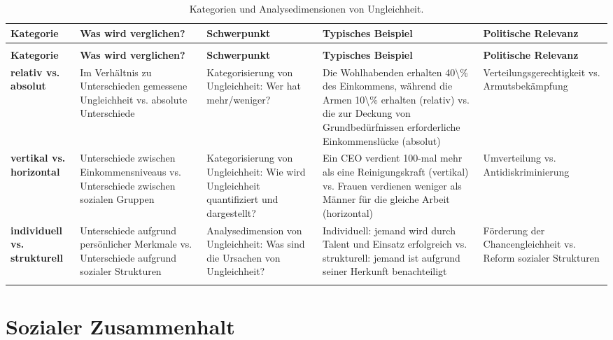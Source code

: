 \documentclass[
  nswissgerman,
  a4paper,
  openany]{book}
\begin{document}
\begin{longtable}[t]{>{\raggedright\arraybackslash}p{1.6cm}>{\raggedright\arraybackslash}p{3.0cm}>{\raggedright\arraybackslash}p{3.0cm}>{\raggedright\arraybackslash}p{3.0cm}l}

\caption{\label{tbl-inequality-categories}Kategorien und
Analysedimensionen von Ungleichheit.}

\tabularnewline

\toprule
\textbf{Kategorie} & \textbf{Was wird verglichen?} & \textbf{Schwerpunkt} & \textbf{Typisches Beispiel} & \textbf{Politische Relevanz}\\
\midrule
\endfirsthead
\multicolumn{5}{@{}l}{\textit{(continued)}}\\
\toprule
\textbf{Kategorie} & \textbf{Was wird verglichen?} & \textbf{Schwerpunkt} & \textbf{Typisches Beispiel} & \textbf{Politische Relevanz}\\
\midrule
\endhead

\endfoot
\bottomrule
\endlastfoot
\textbf{relativ vs. absolut} & Im Verhältnis zu Unterschieden gemessene Ungleichheit vs. absolute Unterschiede & Kategorisierung von Ungleichheit: Wer hat mehr/weniger? & Die Wohlhabenden erhalten 40\textbackslash{}\% des Einkommens, während die Armen 10\textbackslash{}\% erhalten (relativ) vs. die zur Deckung von Grundbedürfnissen erforderliche Einkommenslücke (absolut) & Verteilungsgerechtigkeit vs. Armutsbekämpfung\\
\textbf{vertikal vs. horizontal} & Unterschiede zwischen Einkommensniveaus vs. Unterschiede zwischen sozialen Gruppen & Kategorisierung von Ungleichheit: Wie wird Ungleichheit quantifiziert und dargestellt? & Ein CEO verdient 100-mal mehr als eine Reinigungskraft (vertikal) vs. Frauen verdienen weniger als Männer für die gleiche Arbeit (horizontal) & Umverteilung vs. Antidiskriminierung\\
\textbf{individuell vs. strukturell} & Unterschiede aufgrund persönlicher Merkmale vs. Unterschiede aufgrund sozialer Strukturen & Analysedimension von Ungleichheit: Was sind die Ursachen von Ungleichheit? & Individuell: jemand wird durch Talent und Einsatz erfolgreich vs. strukturell: jemand ist aufgrund seiner Herkunft benachteiligt & Förderung der Chancengleichheit vs. Reform sozialer Strukturen\\*

\end{longtable}

\endgroup{}

\section{Sozialer Zusammenhalt}\label{sozialer-zusammenhalt}
\end{document}
